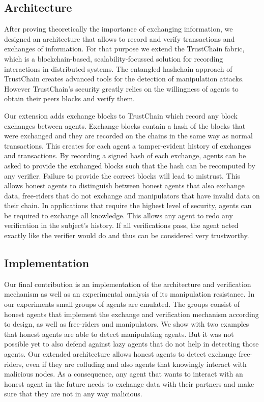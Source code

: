 \subsection{Architecture}
After proving theoretically the importance of exchanging information, we designed an architecture that allows to 
record and verify transactions and exchanges of information. For that purpose we extend the
TrustChain fabric, which is a blockchain-based, scalability-focussed solution for recording 
interactions in distributed systems. The entangled hashchain approach of TrustChain creates advanced
tools for the detection of manipulation attacks. However TrustChain's security greatly relies on the
willingness of agents to obtain their peers blocks and verify them. 

Our extension adds exchange blocks to TrustChain which record any block exchanges between agents. 
Exchange blocks contain a hash of the blocks that were exchanged and they are recorded on the chains
in the same way as normal transactions. This creates for each agent a tamper-evident history of exchanges and
transactions. By recording a signed hash of each exchange, agents can be asked to provide the exchanged
blocks such that the hash can be recomputed by any verifier. Failure to provide the correct blocks 
will lead to mistrust. This allows honest agents to distinguish
between honest agents that also exchange data, free-riders that do not 
exchange and manipulators that have invalid data on their chain. In applications that require the 
highest level of security, agents can be required to exchange all knowledge. This allows any agent 
to redo any verification in the subject's history. If all verifications pass, the agent acted exactly
like the verifier would do and thus can be considered very trustworthy.

\subsection{Implementation}
Our final contribution is an implementation of the architecture and verification mechanism as well as
an experimental analysis of its manipulation resistance. In our experiments small groups of agents 
are emulated. The groups consist of honest agents that implement the exchange and verification 
mechanism according to design, as well as free-riders and manipulators. We show with two examples
that honest agents are able to detect manipulating agents. But it was not possible yet to also 
defend against lazy agents
that do not help in detecting those agents. Our extended architecture allows honest agents to 
detect exchange free-riders, even if they are colluding and also agents that knowingly interact with
malicious nodes. As a consequence, any agent that wants to interact with an honest agent in the future
needs to exchange data with their partners and make sure that they are not in any way malicious.

